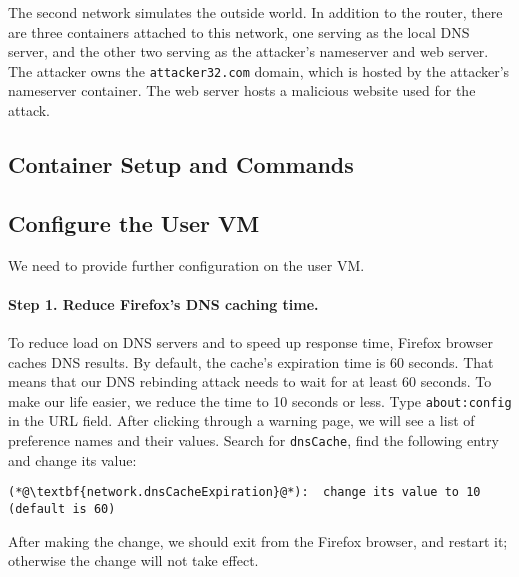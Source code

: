 The second network simulates the outside world. In addition to
the router, there are three containers attached to this network,
one serving as the local DNS server, and the other two
serving as the attacker's nameserver and web server.
The attacker owns the \texttt{attacker32.com} domain, 
which is hosted by the attacker's nameserver container. 
The web server hosts a malicious website used for the 
attack. 



\subsection{Container Setup and Commands}






\subsection{Configure the User VM}

We need to provide further configuration on the user VM.


\paragraph{Step 1. Reduce Firefox's DNS caching time.}
To reduce load on DNS servers and to speed up response time, Firefox browser caches DNS
results.  By default, the cache's expiration time is 60 seconds. That means that our DNS
rebinding attack needs to wait for at least 60 seconds. To make our life easier, we reduce
the time to 10 seconds or less. Type \texttt{about:config} in the URL field.
After clicking through a warning page, we will see a list of preference names and their values.
Search for \texttt{dnsCache}, find the following entry and change its value:

\begin{lstlisting}
(*@\textbf{network.dnsCacheExpiration}@*):  change its value to 10 (default is 60)
\end{lstlisting}

After making the change, we should exit from the Firefox browser, and restart it; otherwise the
change will not take effect.


